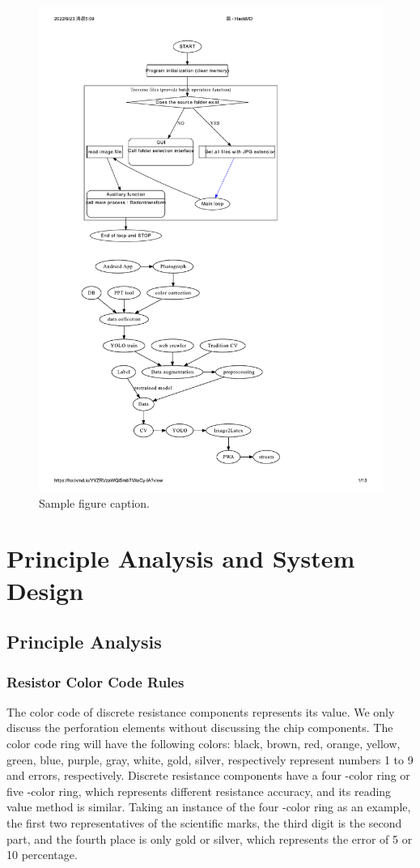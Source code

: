 \documentclass{article}
\begin{document}
\begin{figure}
	\centering
	\includegraphics[width=0.7\linewidth]{ppp10.pdf}
	\caption{Sample figure caption.}
	\label{fig:ppp10}
\end{figure}

\section{Principle Analysis and System Design}
\subsection{Principle Analysis}

\subsubsection{Resistor Color Code Rules}
The color code of discrete resistance components represents its value. We only discuss the perforation elements without discussing the chip components. The color code ring will have the following colors: black, brown, red, orange, yellow, green, blue, purple, gray, white, gold, silver, respectively represent numbers 1 to 9 and errors, respectively. Discrete resistance components have a four -color ring or five -color ring, which represents different resistance accuracy, and its reading value method is similar. Taking an instance of the four -color ring as an example, the first two representatives of the scientific marks, the third digit is the second part, and the fourth place is only gold or silver, which represents the error of 5 or 10 percentage.
\end{document}
